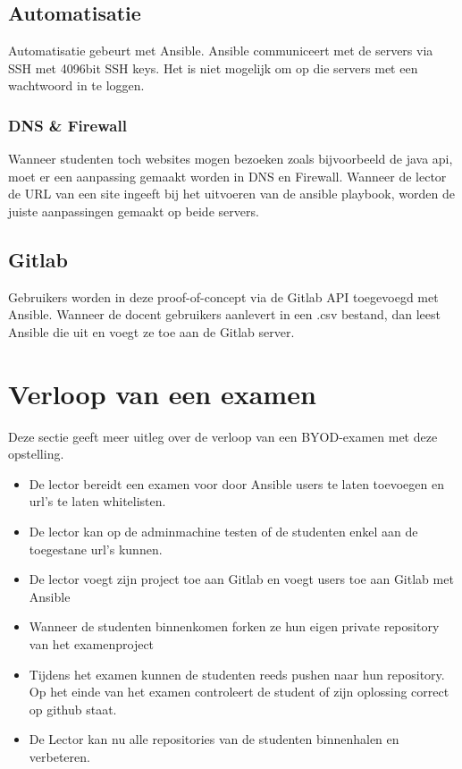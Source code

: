 \subsection{Automatisatie}
Automatisatie gebeurt met Ansible. Ansible communiceert met de servers via SSH met 4096bit SSH keys. Het is niet mogelijk om op die servers met een wachtwoord in te loggen.

\subsubsection{DNS \& Firewall}
Wanneer studenten toch websites mogen bezoeken zoals bijvoorbeeld de java api, moet er een aanpassing gemaakt worden in DNS en Firewall. Wanneer de lector de URL van een site ingeeft bij het uitvoeren van de ansible playbook, worden de juiste aanpassingen gemaakt op beide servers.

\subsection{Gitlab}
Gebruikers worden in deze proof-of-concept via de Gitlab API toegevoegd met Ansible. Wanneer de docent gebruikers aanlevert in een .csv bestand, dan leest Ansible die uit en voegt ze toe aan de Gitlab server. 

\section{Verloop van een examen}
Deze sectie geeft meer uitleg over de verloop van een BYOD-examen met deze opstelling.

\begin{itemize}
	\item De lector bereidt een examen voor door Ansible users te laten toevoegen en url's te laten whitelisten.
	\item De lector kan op de adminmachine testen of de studenten enkel aan de toegestane url's kunnen.
	\item De lector voegt zijn project toe aan Gitlab en voegt users toe aan Gitlab met Ansible
	\item Wanneer de studenten binnenkomen forken ze hun eigen private repository van het examenproject
	\item Tijdens het examen kunnen de studenten reeds pushen naar hun repository. Op het einde van het examen controleert de student of zijn oplossing correct op github staat.
	\item De Lector kan nu alle repositories van de studenten binnenhalen en verbeteren.
\end{itemize}




